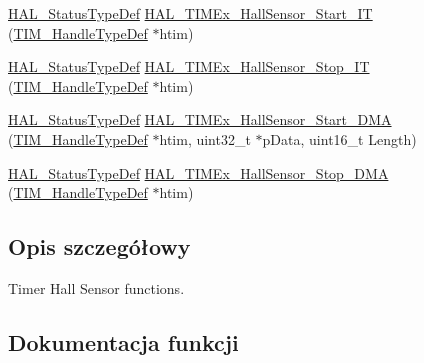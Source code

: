 \begin{DoxyCompactItemize}
\hyperlink{stm32f4xx__hal__def_8h_a63c0679d1cb8b8c684fbb0632743478f}{H\+A\+L\+\_\+\+Status\+Type\+Def} \hyperlink{group___t_i_m_ex___exported___functions___group1_gaf3e7068c5bc6fc74e016cc8e990cbb02}{H\+A\+L\+\_\+\+T\+I\+M\+Ex\+\_\+\+Hall\+Sensor\+\_\+\+Start\+\_\+\+IT} (\hyperlink{struct_t_i_m___handle_type_def}{T\+I\+M\+\_\+\+Handle\+Type\+Def} $\ast$htim)
\item 
\hyperlink{stm32f4xx__hal__def_8h_a63c0679d1cb8b8c684fbb0632743478f}{H\+A\+L\+\_\+\+Status\+Type\+Def} \hyperlink{group___t_i_m_ex___exported___functions___group1_gac6ab7ab0cada425a8d4deb637bd2ad71}{H\+A\+L\+\_\+\+T\+I\+M\+Ex\+\_\+\+Hall\+Sensor\+\_\+\+Stop\+\_\+\+IT} (\hyperlink{struct_t_i_m___handle_type_def}{T\+I\+M\+\_\+\+Handle\+Type\+Def} $\ast$htim)
\item 
\hyperlink{stm32f4xx__hal__def_8h_a63c0679d1cb8b8c684fbb0632743478f}{H\+A\+L\+\_\+\+Status\+Type\+Def} \hyperlink{group___t_i_m_ex___exported___functions___group1_ga3d0d063498f6888d61411d56380f5211}{H\+A\+L\+\_\+\+T\+I\+M\+Ex\+\_\+\+Hall\+Sensor\+\_\+\+Start\+\_\+\+D\+MA} (\hyperlink{struct_t_i_m___handle_type_def}{T\+I\+M\+\_\+\+Handle\+Type\+Def} $\ast$htim, uint32\+\_\+t $\ast$p\+Data, uint16\+\_\+t Length)
\item 
\hyperlink{stm32f4xx__hal__def_8h_a63c0679d1cb8b8c684fbb0632743478f}{H\+A\+L\+\_\+\+Status\+Type\+Def} \hyperlink{group___t_i_m_ex___exported___functions___group1_gab361d1aa6e0eb244886b93908beded6f}{H\+A\+L\+\_\+\+T\+I\+M\+Ex\+\_\+\+Hall\+Sensor\+\_\+\+Stop\+\_\+\+D\+MA} (\hyperlink{struct_t_i_m___handle_type_def}{T\+I\+M\+\_\+\+Handle\+Type\+Def} $\ast$htim)
\end{DoxyCompactItemize}


\subsection{Opis szczegółowy}
Timer Hall Sensor functions. 



\subsection{Dokumentacja funkcji}
\mbox{\label{group___t_i_m_ex___exported___functions___group1_ga61f3c18eb8fe53b65b55ec855072631d}} 
